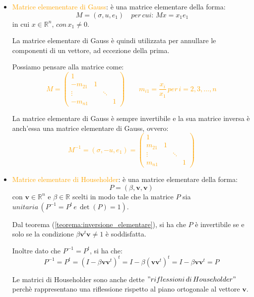 \begin{itemize}
\item \textcolor{orange}{Matrice elemenentare di Gauss}: è una matrice elementare della forma:
\[\ M = (\sigma, u, e_1) \quad per \, cui: \, Mx = x_1 e_1\]
in cui $x \in \mathbb{R}^n, \, con \, x_1 \neq 0$.

La matrice elementare di Gauss è quindi utilizzata per annullare le componenti di un vettore, ad eccezione della prima.

Possiamo pensare alla matrice come:
\textcolor{orange}{\[
M =
\begin{pmatrix}
1 &  &  &  \\
-m_{21} & 1 &  & \\
\vdots & & \ddots &  \\
-m_{n1} &  &  & 1
\end{pmatrix} \qquad m_{i1} = \frac{x_i}{x_1} \, per \, i = 2, 3, \ldots, n
\]}

La matrice elementare di Gauss è sempre invertibile e la sua matrice inversa è anch'essa una matrice elementare di Gauss, ovvero:
\textcolor{orange}{\[
M^{-1} = (\sigma, -u, e_1)= \begin{pmatrix}
1 &  &  &  \\
m_{21} & 1 &  & \\
\vdots & & \ddots &  \\
m_{n1} &  &  & 1
\end{pmatrix}
\]}

\item \textcolor{orange}{Matrice elementare di Householder}: è una matrice elementare della forma:
\[
P = (\beta, \textbf{v}, \textbf{v})
\]
con $\textbf{v} \in \mathbb{R}^n$ e $\beta \in \mathbb{R}$ scelti in modo tale che
la matrice $P$ sia $unitaria \, (P^{-1} = P^t \, e \, \det(P) = 1)$.

Dal teorema (\ref{teorema:inversione_elementare}), si ha che $P$ è invertibile
se e solo se la condizione $\beta \textbf{v}^t \textbf{v} \neq 1$ è soddisfatta.

Inoltre dato che $P^{-1} = P^t$, si ha che:
\[
    P^{-1} = P^t = (I - \beta \textbf{v} \textbf{v}^t)^t = I - \beta (\textbf{v} \textbf{v}^t)^t = I - \beta \textbf{v} \textbf{v}^t = P
\]

Le matrici di Householder sono anche dette \textcolor{orange}{$"riflessioni \, di \, Householder"$}
perchè rappresentano una riflessione rispetto al piano ortogonale al vettore $\textbf{v}$.


\end{itemize}
